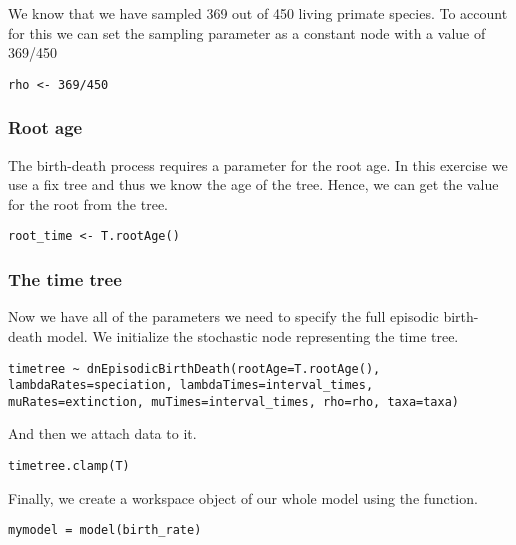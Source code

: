 We know that we have sampled 369 out of 450 living primate species. 
To account for this we can set the sampling parameter as a constant node with a value of 369/450
{\tt \begin{snugshade*}
\begin{lstlisting}
rho <- 369/450
\end{lstlisting}
\end{snugshade*}}


\subsubsection{Root age}

The birth-death process requires a parameter for the root age.
In this exercise we use a fix tree and thus we know the age of the tree.
Hence, we can get the value for the root from the \citet{Springer2012} tree.
{\tt \begin{snugshade*}
\begin{lstlisting}
root_time <- T.rootAge()
\end{lstlisting}
\end{snugshade*}}

\subsubsection{The time tree}

Now we have all of the parameters we need to specify the full episodic birth-death model. 
We initialize the stochastic node representing the time tree.
{\tt \begin{snugshade*}
\begin{lstlisting}
timetree ~ dnEpisodicBirthDeath(rootAge=T.rootAge(), lambdaRates=speciation, lambdaTimes=interval_times, muRates=extinction, muTimes=interval_times, rho=rho, taxa=taxa)
\end{lstlisting}
\end{snugshade*}}
And then we attach data to it.
{\tt \begin{snugshade*}
\begin{lstlisting}
timetree.clamp(T)
\end{lstlisting}
\end{snugshade*}}

Finally, we create a workspace object of our whole model using the  function. 
{\tt \begin{snugshade*}
\begin{lstlisting}
mymodel = model(birth_rate)
\end{lstlisting}
\end{snugshade*}}


